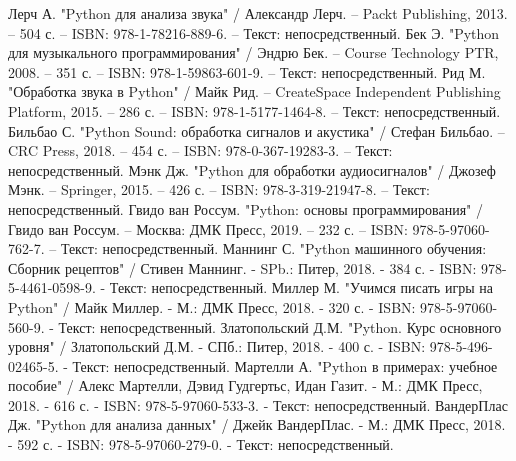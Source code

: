 
\begin{thebibliography}{9}

     Лерч А. "Python для анализа звука" / Александр Лерч. – Packt Publishing, 2013. – 504 с. – ISBN: 978-1-78216-889-6. – Текст: непосредственный.
     Бек Э. "Python для музыкального программирования" / Эндрю Бек. – Course Technology PTR, 2008. – 351 с. – ISBN: 978-1-59863-601-9. – Текст: непосредственный.
     Рид М. "Обработка звука в Python" / Майк Рид. – CreateSpace Independent Publishing Platform, 2015. – 286 с. – ISBN: 978-1-5177-1464-8. – Текст: непосредственный.
    	Бильбао С. "Python Sound: обработка сигналов и акустика" / Стефан Бильбао. – CRC Press, 2018. – 454 с. – ISBN: 978-0-367-19283-3. – Текст: непосредственный.
	 Мэнк Дж. "Python для обработки аудиосигналов" / Джозеф Мэнк. – Springer, 2015. – 426 с. – ISBN: 978-3-319-21947-8. – Текст: непосредственный.
		Гвидо ван Россум. "Python: основы программирования" / Гвидо ван Россум. – Москва: ДМК Пресс, 2019. – 232 с. – ISBN: 978-5-97060-762-7. – Текст: непосредственный.
		Маннинг С. "Python машинного обучения: Сборник рецептов" / Стивен Маннинг. - SPb.: Питер, 2018. - 384 с. - ISBN: 978-5-4461-0598-9. - Текст: непосредственный.
	 Миллер М. "Учимся писать игры на Python" / Майк Миллер. - М.: ДМК Пресс, 2018. - 320 с. - ISBN: 978-5-97060-560-9. - Текст: непосредственный.
	 Златопольский Д.М. "Python. Курс основного уровня" / Златопольский Д.М. - СПб.: Питер, 2018. - 400 с. - ISBN: 978-5-496-02465-5. - Текст: непосредственный.   
	 Мартелли А. "Python в примерах: учебное пособие" / Алекс Мартелли, Дэвид Гудгертьс, Идан Газит. - М.: ДМК Пресс, 2018. - 616 с. - ISBN: 978-5-97060-533-3. - Текст: непосредственный.
	 ВандерПлас Дж. "Python для анализа данных" / Джейк ВандерПлас. - М.: ДМК Пресс, 2018. - 592 с. - ISBN: 978-5-97060-279-0. - Текст: непосредственный.
\end{thebibliography}
